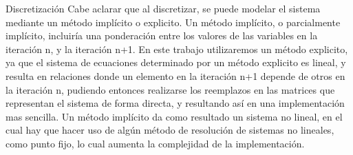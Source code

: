 \begin{section}{Discretización}
Cabe aclarar que al discretizar, se puede modelar el sistema mediante un método implícito o explicito. Un método implícito, o parcialmente implícito, incluiría una ponderación entre los valores de las variables en la iteración n, y la iteración n+1. En este trabajo utilizaremos un método explicito, ya que el sistema de ecuaciones determinado por un método explicito es lineal, y resulta en relaciones donde un elemento en la iteración n+1 depende de otros en la iteración n, pudiendo entonces realizarse los reemplazos en las matrices que representan el sistema de forma directa, y resultando así en una implementación mas sencilla. Un método implícito da como resultado un sistema no lineal, en el cual hay que hacer uso de algún método de resolución de sistemas no lineales, como punto fijo, lo cual aumenta la complejidad de la implementación.

\end{section}